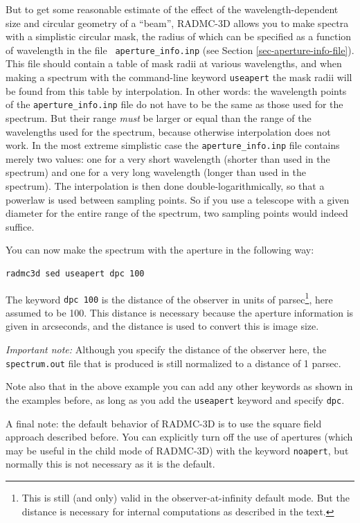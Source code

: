 \documentclass{report}
\begin{document}
But to get some reasonable estimate of the effect of the
wavelength-dependent size and circular geometry of a ``beam'', RADMC-3D
allows you to make spectra with a simplistic circular mask, the radius of
which can be specified as a function of wavelength in the file {\small\tt
  aperture\_info.inp} (see Section \ref{sec-aperture-info-file}).  This file
should contain a table of mask radii at various wavelengths, and when making
a spectrum with the command-line keyword {\small\tt useapert} the mask radii
will be found from this table by interpolation. In other words: the
wavelength points of the {\small\tt aperture\_info.inp} file do not have to
be the same as those used for the spectrum. But their range {\em must} be
larger or equal than the range of the wavelengths used for the spectrum,
because otherwise interpolation does not work. In the most extreme
simplistic case the {\small\tt aperture\_info.inp} file contains merely two
values: one for a very short wavelength (shorter than used in the spectrum)
and one for a very long wavelength (longer than used in the spectrum). The
interpolation is then done double-logarithmically, so that a powerlaw is
used between sampling points. So if you use a telescope with a given
diameter for the entire range of the spectrum, two sampling points would
indeed suffice.

You can now make the spectrum with the aperture in the following way:
{\small\begin{verbatim}
radmc3d sed useapert dpc 100
\end{verbatim}}
The keyword {\small\tt dpc 100} is the distance of the observer in units of
parsec\footnote{This is still (and only) valid in the observer-at-infinity
  default mode. But the distance is necessary for internal computations as
  described in the text.}, here assumed to be 100. 
This distance is necessary because the aperture information
is given in arcseconds, and the distance is used to convert this is
image size. 

{\em Important note:} Although you specify the distance of the observer
here, the {\small\tt spectrum.out} file that is produced is still normalized
to a distance of 1 parsec. 

Note also that in the above example you can add any other keywords as shown
in the examples before, as long as you add the {\small\tt useapert} keyword
and specify {\small\tt dpc}.

A final note: the default behavior of RADMC-3D is to use the square field
approach described before. You can explicitly turn off the use of apertures
(which may be useful in the child mode of RADMC-3D) with the keyword
{\small\tt noapert}, but normally this is not necessary as it is the
default.
\end{document}
